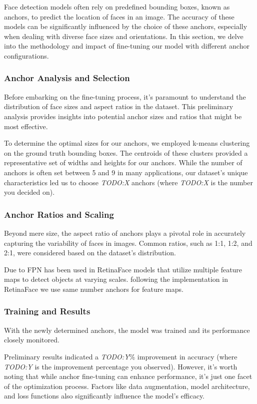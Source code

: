 \documentclass{article}
\begin{document}
Face detection models often rely on predefined bounding boxes, known as anchors, to predict the location of faces in an image. The accuracy of these models can be significantly influenced by the choice of these anchors, especially when dealing with diverse face sizes and orientations. In this section, we delve into the methodology and impact of fine-tuning our model with different anchor configurations.

\subsubsection{Anchor Analysis and Selection}

Before embarking on the fine-tuning process, it's paramount to understand the distribution of face sizes and aspect ratios in the dataset. This preliminary analysis provides insights into potential anchor sizes and ratios that might be most effective.

To determine the optimal sizes for our anchors, we employed k-means clustering on the ground truth bounding boxes. The centroids of these clusters provided a representative set of widths and heights for our anchors. While the number of anchors is often set between 5 and 9 in many applications, 
our dataset's unique characteristics led us to choose \textit{TODO:X} anchors (where \textit{TODO:X} is the number you decided on).

\subsubsection{Anchor Ratios and Scaling}

Beyond mere size, the aspect ratio of anchors plays a pivotal role in accurately capturing the variability of faces in images. Common ratios, such as 1:1, 1:2, and 2:1, were considered based on the dataset's distribution.

Due to FPN has been used in RetinaFace models that utilize multiple feature maps to detect objects at varying scales.
following the implementation in RetinaFace we use same number anchors for feature maps.

\subsubsection{Training and Results}

With the newly determined anchors, the model was trained and its performance closely monitored. 

Preliminary results indicated a \textit{TODO:Y}\% improvement in accuracy (where \textit{TODO:Y} is the improvement percentage you observed). However, it's worth noting that while anchor fine-tuning can enhance performance, it's just one facet of the optimization process. Factors like data augmentation, model architecture, and loss functions also significantly influence the model's efficacy.
\end{document}
